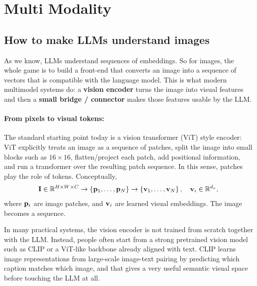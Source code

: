 \documentclass[11pt]{article}  %
\begin{document}
\section{Multi Modality}


\subsection{How to make LLMs understand images}
As we know, LLMs understand sequences of embeddings.
So for images, the whole game is to build a front-end that converts an image into a sequence of vectors that is compatible with the language model.
This is what modern multimodel systems do: a \textbf{vision encoder} turns the image into visual features and then a \textbf{small bridge / connector} makes those features usable by the LLM.

\paragraph{From pixels to visual tokens:}
The standard starting point today is a vision transformer (ViT) style encoder: ViT explicitly treats an image as a sequence of patches, split the image into small blocks such as $16 \times 16$, flatten/project each patch, add positional information, and run a transformer over the resulting patch sequence.
In this sense, patches play the role of tokens.
Conceptually, 
\begin{align*}
  \mathbf{I} \in \mathbb{R}^{H \times W \times C} \rightarrow \left\{ \mathbf{p}_1, \hdots, \mathbf{p}_N \right\} \rightarrow \left\{ \mathbf{v}_1, \hdots, \mathbf{v}_N \right\}, \quad \mathbf{v}_i \in \mathbb{R}^{d_v},
\end{align*}
where $\mathbf{p}_i$ are image patches, and $\mathbf{v}_i$ are learned visual embeddings.
The image becomes a sequence.

In many practical systems, the vision encoder is not trained from scratch together with the LLM.
Instead, people often start from a strong pretrained vision model such as CLIP or a ViT-like backbone already aligned with text.
CLIP learns image representations from large-scale image-text pairing by predicting which caption matches which image, and that gives a very useful semantic visual space before touching the LLM at all.
\end{document}
